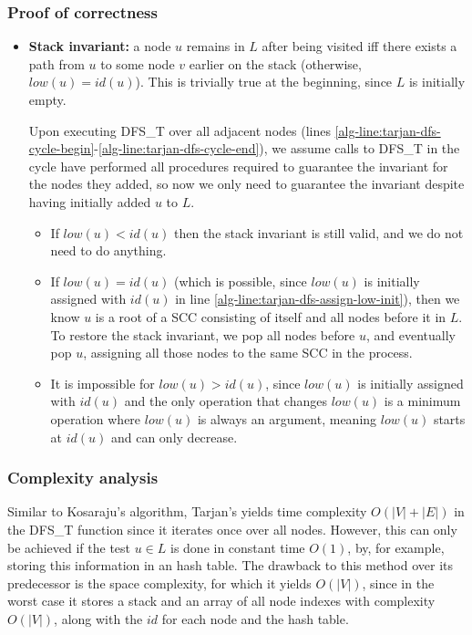 \subsubsection{Proof of correctness}
\begin{itemize}
    \item \textbf{Stack invariant:} a node $u$ remains in $L$ after being visited iff there exists a path from $u$ to some node $v$ earlier on the stack (otherwise, $low(u)=id(u)$). This is trivially true at the beginning, since $L$ is initially empty.\par
    Upon executing \textsc{DFS\_T} over all adjacent nodes (lines \ref*{alg-line:tarjan-dfs-cycle-begin}-\ref*{alg-line:tarjan-dfs-cycle-end}), we assume calls to \textsc{DFS\_T} in the cycle have performed all procedures required to guarantee the invariant for the nodes they added, so now we only need to guarantee the invariant despite having initially added $u$ to $L$.
    \begin{itemize}
        \item If $low(u) < id(u)$ then the stack invariant is still valid, and we do not need to do anything.
        \item If $low(u)=id(u)$ (which is possible, since $low(u)$ is initially assigned with $id(u)$ in line \ref{alg-line:tarjan-dfs-assign-low-init}), then we know $u$ is a root of a \acrshort*{SCC} consisting of itself and all nodes before it in $L$. To restore the stack invariant, we pop all nodes before $u$, and eventually pop $u$, assigning all those nodes to the same \acrshort*{SCC} in the process.
        \item It is impossible for $low(u) > id(u)$, since $low(u)$ is initially assigned with $id(u)$ and the only operation that changes $low(u)$ is a minimum operation where $low(u)$ is always an argument, meaning $low(u)$ starts at $id(u)$ and can only decrease.
    \end{itemize}
\end{itemize}
\subsubsection{Complexity analysis}
Similar to Kosaraju's algorithm, Tarjan's yields time complexity $O(|V|+|E|)$ in the \textsc{DFS\_T} function since it iterates once over all nodes. However, this can only be achieved if the test $u \in L$ is done in constant time $O(1)$, by, for example, storing this information in an hash table.
The drawback to this method over its predecessor is the space complexity, for which it yields $O(|V|)$, since in the worst case it stores a stack and an array of all node indexes with complexity $O(|V|)$, along with the $id$ for each node and the hash table. 